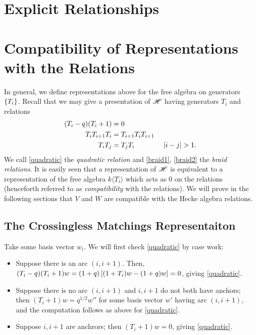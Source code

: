 \documentclass{amsart}
\begin{document}
 
\section{Explicit Relationships}


\newpage
\appendix
\section{Compatibility of Representations with the Relations}
In general, we define representations above for the free algebra on generators $\left\{ T_i \right\}$.
Recall that we may give a presentation of $\mathscr{H}$ having generators $T_i$ and relations
\begin{align}
  (T_i - q)(T_i + 1) &= 0 \label{quadratic}\\
  T_iT_{i+1}T_i &= T_{i+1}T_iT_{i+1} \label{braid1}\\ 
  T_iT_j &= T_jT_i \hspace{40pt} \left| i - j \right| > 1. \label{braid2}
\end{align}
We call \eqref{quadratic} the \emph{quadratic relation} and \eqref{braid1}, \eqref{braid2} the \emph{braid relations}.
It is easily seen that a representation of $\mathscr{H}$ is equivalent to a representation of the free algebra $k\langle T_i \rangle$ which acts as 0 on the relations (henceforth referred to as \emph{compatibility} with the relations).
We will prove in the following sections that $V$ and $W$ are compatible with the Hecke algebra relations.

\subsection{The Crossingless Matchings Representaiton}
\label{Cross Relations}
Take some basis vector $w_i$.
We will first check \eqref{quadratic} by case work:
\begin{itemize}
  \item Suppose there is an arc $(i,i+1)$.
    Then, $(T_i-q)(T_i + 1)w = (1 + q)\left[ (1 + T_i)w - (1 + q)w \right] = 0$, giving \eqref{quadratic}.

 
  \item Suppose there is no arc $(i,i+1)$ and $i,i+1$ do not both have anchors;
    then $(T_i +  1)w = q^{1/2}w''$ for some basis vector $w'$ having arc $(i,i+1)$, and the computation follows as above for \eqref{quadratic}.
  \item Suppose $i,i+1$ are anchrors;
    then $(T_i + 1)w = 0$, giving \eqref{quadratic}.
\end{itemize}
   
\end{document}
